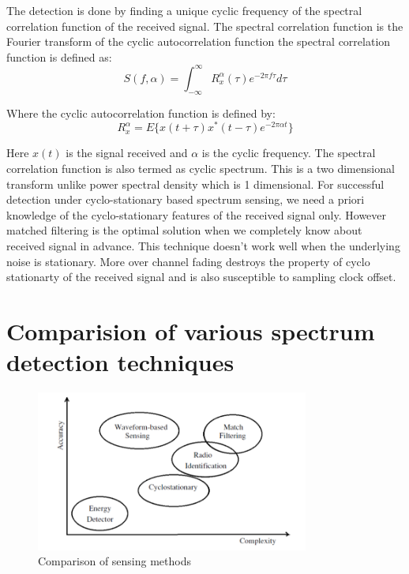 The detection is done by finding a unique cyclic frequency of the spectral 
correlation function of the received signal\cite{cabric04}. The spectral correlation 
function is the Fourier transform of the cyclic autocorrelation function the 
spectral correlation function is defined as:
\begin{equation*}
        S(f,\alpha) = \int_{-\infty}^{\infty} R_{x}^{\alpha}(\tau)e^{-2 \pi f\tau}d\tau 
\end{equation*}

Where the cyclic autocorrelation function is defined by:
\begin{equation*}
    R_{x}^{\alpha} = E\{x(t+\tau)x^{*}(t-\tau)e^{-2 \pi \alpha t}\}
\end{equation*}

Here $x(t)$ is the signal received and $\alpha$ is the cyclic frequency. The spectral 
correlation function is also termed as cyclic spectrum.
This is a two dimensional transform unlike power spectral density which is 1 
dimensional. For successful detection under cyclo-stationary based spectrum 
sensing, we need a priori knowledge of the cyclo-stationary features of the 
received signal only. However matched filtering is the optimal solution when we 
completely know about received signal in advance.
This technique doesn't work well when the underlying noise is stationary. More 
over channel fading destroys the property of cyclo stationarty of the received 
signal and is also susceptible to sampling clock offset. 


\section{Comparision of various spectrum detection techniques}


\begin{figure}[h]
\centering
\includegraphics[width=0.8\textwidth]{compSensingTch}
\caption[Comparison of sensing methods]{Comparison of sensing methods}
\label{compSensingTch}
\end{figure}
 






